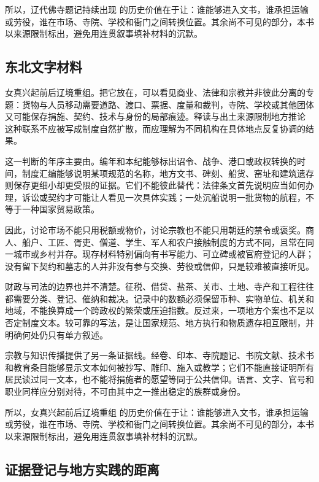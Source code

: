 所以，辽代佛寺题记持续出现 的历史价值在于让：谁能够进入文书，谁承担运输或劳役，谁在市场、寺院、学校和衙门之间转换位置。其余尚不可见的部分，本书以来源限制标出，避免用连贯叙事填补材料的沉默。

\subsection{东北文字材料}

女真兴起前后辽境重组。把它放在，可以看见商业、法律和宗教并非彼此分离的专题：货物与人员移动需要道路、渡口、票据、度量和裁判，寺院、学校或其他团体又可能保存捐施、契约、技术与身份的局部痕迹。释读与出土来源限制地方推论 这种联系不应被写成制度自然扩散，而应理解为不同机构在具体地点反复协调的结果。

这一判断的年序主要由。编年和本纪能够标出诏令、战争、港口或政权转换的时间，制度汇编能够说明某项规范的名称，地方文书、碑刻、船货、窑址和建筑遗存则保存更细小却更受限的证据。它们不能彼此替代：法律条文首先说明应当如何办理，诉讼或契约才可能让人看见一次具体实践；一处沉船说明一批货物的航程，不等于一种国家贸易政策。

因此，讨论市场不能只用税额或物价，讨论宗教也不能只用朝廷的禁令或褒奖。商人、船户、工匠、胥吏、僧道、学生、军人和农户接触制度的方式不同，且常在同一城市或乡村并存。现存材料特别偏向有书写能力、可立碑或被官府登记的人群；没有留下契约和墓志的人并非没有参与交换、劳役或信仰，只是较难被直接听见。

财政与司法的边界也并不清楚。征税、借贷、盐茶、关市、土地、寺产和工程往往都需要分类、登记、催纳和裁决。记录中的数额必须保留币种、实物单位、机关和地域，不能换算成一个跨政权的繁荣或压迫指数。反过来，一项地方个案也不足以否定制度文本。较可靠的写法，是让国家规范、地方执行和物质遗存相互限制，并明确何处仍只有单方叙述。

宗教与知识传播提供了另一条证据线。经卷、印本、寺院题记、书院文献、技术书和教育条目能够显示文本如何被抄写、雕印、施入或教学；它们不能直接证明所有居民读过同一文本，也不能将捐施者的愿望等同于公共信仰。语言、文字、官号和职业同样应分别对待，不可由其中之一推出稳定的族群或身份。

所以，女真兴起前后辽境重组 的历史价值在于让：谁能够进入文书，谁承担运输或劳役，谁在市场、寺院、学校和衙门之间转换位置。其余尚不可见的部分，本书以来源限制标出，避免用连贯叙事填补材料的沉默。

\subsection{证据登记与地方实践的距离}

